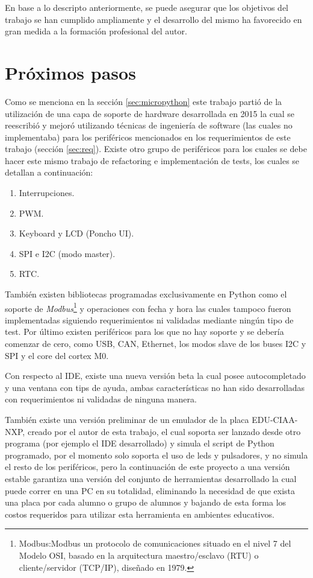 En base a lo descripto anteriormente, se puede asegurar que los objetivos del trabajo se han cumplido ampliamente y el desarrollo del mismo ha favorecido en gran medida a la formación profesional del autor.


\section{Próximos pasos}

Como se menciona en la sección \ref{sec:micropython} este trabajo partió de la utilización de una capa de soporte de hardware desarrollada en 2015 la cual se reescribió y mejoró utilizando técnicas de ingeniería de software (las cuales no implementaba) para los periféricos mencionados en los requerimientos de este trabajo (sección \ref{sec:req}). Existe otro grupo de periféricos para los cuales se debe hacer este mismo trabajo de refactoring e implementación de tests, los cuales se detallan a continuación:

\begin{enumerate}
	\item  Interrupciones.
	\item  PWM.
	\item  Keyboard y LCD (Poncho UI). 
	\item  SPI e I2C (modo master).
	\item  RTC.
\end{enumerate}

También existen bibliotecas programadas exclusivamente en Python como el soporte de \textit{Modbus}\footnote{Modbus:Modbus un protocolo de comunicaciones situado en el nivel 7 del Modelo OSI, basado en la arquitectura maestro/esclavo (RTU) o cliente/servidor (TCP/IP), diseñado en 1979.} y operaciones con fecha y hora las cuales tampoco fueron implementadas siguiendo requerimientos ni validadas mediante ningún tipo de test. Por último existen periféricos para los que no hay soporte y se debería comenzar de cero, como USB, CAN, Ethernet, los modos slave de los buses I2C y SPI y el core del cortex M0.

Con respecto al IDE, existe una nueva versión beta la cual posee autocompletado y una ventana con tips de ayuda, ambas características no han sido desarrolladas con requerimientos ni validadas de ninguna manera.

También existe una versión preliminar de un emulador de la placa EDU-CIAA-NXP, creado por el autor de esta trabajo, el cual soporta ser lanzado desde otro programa (por ejemplo el IDE desarrollado) y simula el script de Python programado, por el momento solo soporta el uso de leds y pulsadores, y no simula el resto de los periféricos, pero la continuación de este proyecto a una versión estable garantiza una versión del conjunto de herramientas desarrollado la cual puede correr en una PC en su totalidad, eliminando la necesidad de que exista una placa por cada alumno o grupo de alumnos y bajando de esta forma los costos requeridos para utilizar esta herramienta en ambientes educativos.

